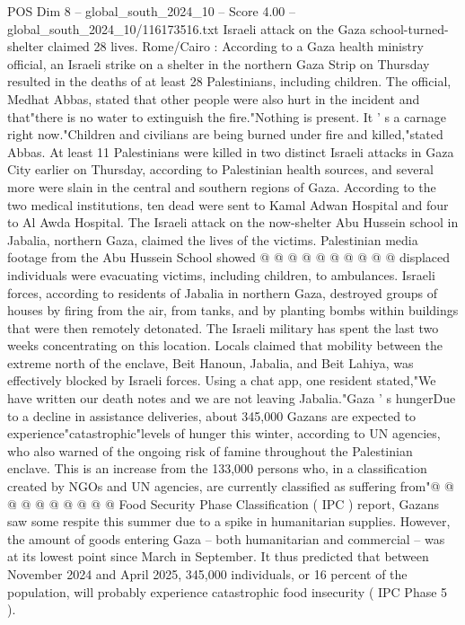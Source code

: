 \begin{textsample}{POS Dim 8 – global\_south\_2024\_10 – Score 4.00 – global\_south\_2024\_10/116173516.txt}  \label{ex:f8_pos_305}
Israeli attack on the Gaza school-turned-shelter claimed 28 lives.
Rome/Cairo : According to a Gaza health ministry official, an Israeli strike on a shelter in the northern Gaza Strip on Thursday resulted in the deaths of at least 28 Palestinians, including children.
The official, Medhat Abbas, stated that other people were also hurt in the incident and that"there is no water to extinguish the fire."Nothing is present.
It ' s a carnage right now."Children and civilians are being burned under fire and killed,"stated Abbas.
At least 11 Palestinians were killed in two distinct Israeli attacks in Gaza City earlier on Thursday, according to Palestinian health sources, and several more were slain in the central and southern regions of Gaza.
According to the two medical institutions, ten dead were sent to Kamal Adwan Hospital and four to Al Awda Hospital.
The Israeli attack on the now-shelter Abu Hussein school in Jabalia, northern Gaza, claimed the lives of the victims.
Palestinian media footage from the Abu Hussein School showed @ @ @ @ @ @ @ @ @ @ displaced individuals were evacuating victims, including children, to ambulances.
Israeli forces, according to residents of Jabalia in northern Gaza, destroyed groups of houses by firing from the air, from tanks, and by planting bombs within buildings that were then remotely detonated.
The Israeli military has spent the last two weeks concentrating on this location.
Locals claimed that mobility between the extreme north of the enclave, Beit Hanoun, Jabalia, and Beit Lahiya, was effectively blocked by Israeli forces.
Using a chat app, one resident stated,"We have written our death notes and we are not leaving Jabalia."Gaza ' s hungerDue to a decline in assistance deliveries, about 345,000 Gazans are expected to experience"catastrophic"levels of hunger this winter, according to UN agencies, who also warned of the ongoing risk of famine throughout the Palestinian enclave.
This is an increase from the 133,000 persons who, in a classification created by NGOs and UN agencies, are currently classified as suffering from"@ @ @ @ @ @ @ @ @ @ Food Security Phase Classification ( IPC ) report, Gazans saw some respite this summer due to a spike in humanitarian supplies.
However, the amount of goods entering Gaza -- both humanitarian and commercial -- was at its lowest point since March in September.
It thus predicted that between November 2024 and April 2025, 345,000 individuals, or 16 percent of the population, will probably experience catastrophic food insecurity ( IPC Phase 5 ).

\end{textsample}
